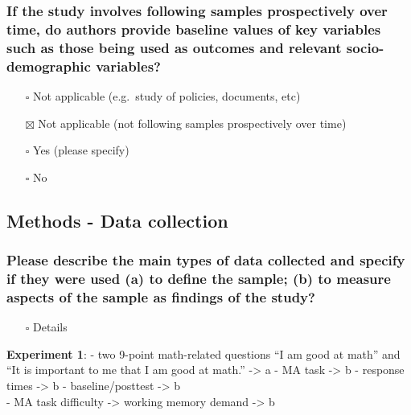 \documentclass[
  doc, a4paper]{apa7}
\providecommand{\tightlist}{%
  \setlength{\itemsep}{0pt}\setlength{\parskip}{0pt}}
\begin{document}
\subsubsection{If the study involves following samples prospectively over time, do authors provide baseline values of key variables such as those being used as outcomes and relevant socio-demographic variables?}\label{if-the-study-involves-following-samples-prospectively-over-time-do-authors-provide-baseline-values-of-key-variables-such-as-those-being-used-as-outcomes-and-relevant-socio-demographic-variables}

\begin{itemize}
\tightlist
\item[$\square$]
  Not applicable (e.g.~study of policies, documents, etc)
\item[$\boxtimes$]
  Not applicable (not following samples prospectively over time)
\item[$\square$]
  Yes (please specify)
\item[$\square$]
  No
\end{itemize}

\subsection{Methods - Data collection}\label{methods---data-collection}

\subsubsection{Please describe the main types of data collected and specify if they were used (a) to define the sample; (b) to measure aspects of the sample as findings of the study?}\label{please-describe-the-main-types-of-data-collected-and-specify-if-they-were-used-a-to-define-the-sample-b-to-measure-aspects-of-the-sample-as-findings-of-the-study}

\begin{itemize}
\tightlist
\item[$\square$]
  Details
\end{itemize}

\textbf{Experiment 1}:
- two 9-point math-related questions ``I am good at math'' and ``It is important to me that I am good at math.'' -\textgreater{} a
- MA task -\textgreater{} b
- response times -\textgreater{} b
- baseline/posttest -\textgreater{} b\\
- MA task difficulty -\textgreater{} working memory demand -\textgreater{} b
\end{document}
